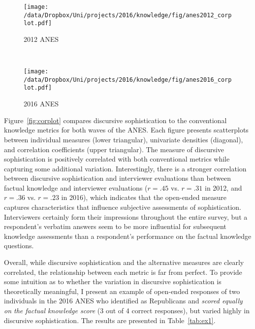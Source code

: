 \begin{figure*}[h]
    \centering
    \begin{subfigure}[t]{0.5\textwidth}
        \centering
        \texttt{[image: /data/Dropbox/Uni/projects/2016/knowledge/fig/anes2012\_corplot.pdf]}
        \caption{2012 ANES}
    \end{subfigure}%
    ~ 
    \begin{subfigure}[t]{0.5\textwidth}
        \centering
        \texttt{[image: /data/Dropbox/Uni/projects/2016/knowledge/fig/anes2016\_corplot.pdf]}
        \caption{2016 ANES}
    \end{subfigure}
    \caption[Correlation matrix of discursive sophistication and conventional political knowledge metrics]{Correlation matrix of discursive sophistication and conventional political knowledge metrics. The plots on the diagonal display univariate densities for each variable. The panels in the lower triangular display the scatter plot of two measures as well as a linear fit. The upper triangular displays the correlation coefficient. All correlations reported are statistically significant with $p<.05$.}\label{fig:corplot}
\end{figure*}

Figure~\ref{fig:corplot} compares discursive sophistication to the conventional knowledge metrics for both waves of the ANES. Each figure presents scatterplots between individual measures (lower triangular), univariate densities (diagonal), and correlation coefficients (upper triangular). The measure of discursive sophistication is positively correlated with both conventional metrics while capturing some additional variation. Interestingly, there is a stronger correlation between discursive sophistication and interviewer evaluations than between factual knowledge and interviewer evaluations ($r=.45$ vs. $r=.31$ in 2012, and $r=.36$ vs. $r=.23$ in 2016), which indicates that the open-ended measure captures characteristics that influence subjective assessments of sophistication. Interviewers certainly form their impressions throughout the entire survey, but a respondent's verbatim answers seem to be more influential for subsequent knowledge assessments than a respondent's performance on the factual knowledge questions.

Overall, while discursive sophistication and the alternative measures are clearly correlated, the relationship between each metric is far from perfect. To provide some intuition as to whether the variation in discursive sophistication is theoretically meaningful, I present an example of open-ended responses of two individuals in the 2016 ANES who identified as Republicans and \textit{scored equally on the factual knowledge score} (3 out of 4 correct responses), but varied highly in discursive sophistication. The results are presented in Table~\ref{tab:ex1}.

